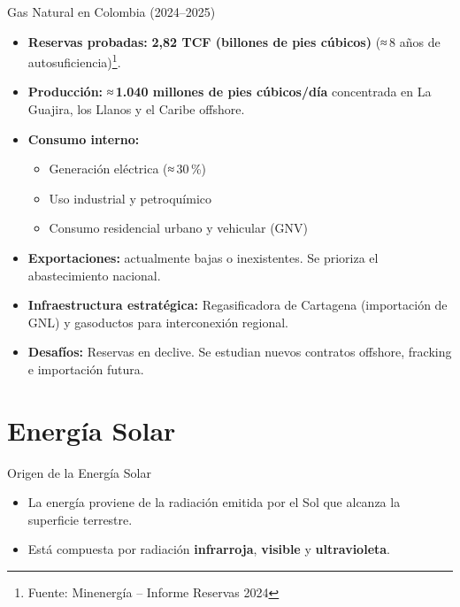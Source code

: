 \documentclass[main.tex]{subfiles}
\begin{document}
\begin{frame}{Gas Natural en Colombia (2024–2025)}
    \small
    \begin{itemize}
        \item \textbf{Reservas probadas:} \textbf{2,82 TCF (billones de pies cúbicos)}  
        (≈ 8 años de autosuficiencia)\footnote{Fuente: Minenergía – Informe Reservas 2024}.

        \item \textbf{Producción:} ≈ \textbf{1.040 millones de pies cúbicos/día}  
        concentrada en La Guajira, los Llanos y el Caribe offshore.

        \item \textbf{Consumo interno:}  
        \begin{itemize}
            \item Generación eléctrica (≈ 30\,\%)
            \item Uso industrial y petroquímico
            \item Consumo residencial urbano y vehicular (GNV)
        \end{itemize}

        \item \textbf{Exportaciones:} actualmente bajas o inexistentes.  
        Se prioriza el abastecimiento nacional.

        \item \textbf{Infraestructura estratégica:}  
        Regasificadora de Cartagena (importación de GNL)  
        y gasoductos para interconexión regional.

        \item \textbf{Desafíos:}  
        Reservas en declive. Se estudian nuevos contratos offshore, fracking e importación futura.
    \end{itemize}
\end{frame}

\section{Energía Solar}

\begin{frame}{Origen de la Energía Solar}
    \begin{itemize}
        \item La energía proviene de la radiación emitida por el Sol que alcanza la superficie terrestre.
        \item Está compuesta por radiación \textbf{infrarroja}, \textbf{visible} y \textbf{ultravioleta}.
    \end{itemize}
\end{frame}
\end{document}
